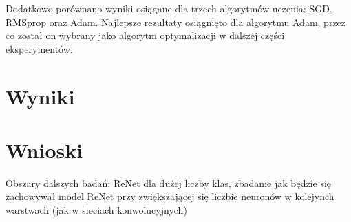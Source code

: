 \documentclass[oneside, mag]{mgr}
\begin{document}
Dodatkowo porównano wyniki osiągane dla trzech algorytmów uczenia: SGD, RMSprop oraz Adam. Najlepsze rezultaty osiągnięto dla algorytmu Adam, przez co został on wybrany jako algorytm optymalizacji w dalszej części eksperymentów.


\chapter{Wyniki}


\chapter{Wnioski}

Obszary dalszych badań:
ReNet dla dużej liczby klas,
zbadanie jak będzie się zachowywał model ReNet przy zwiększającej się liczbie neuronów w kolejynch warstwach (jak w sieciach konwolucyjnych)



\listoffigures
\end{document}

